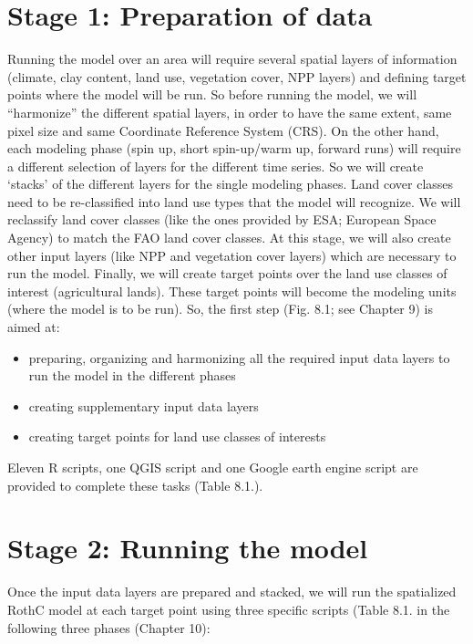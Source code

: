 \documentclass[
  10pt,
  b5paper,
]{book}
\providecommand{\tightlist}{%
  \setlength{\itemsep}{0pt}\setlength{\parskip}{0pt}}
\begin{document}
\hypertarget{stage-1-preparation-of-data}{%
\section{Stage 1: Preparation of data}\label{stage-1-preparation-of-data}}

Running the model over an area will require several spatial layers of information (climate, clay content, land use, vegetation cover, NPP layers) and defining target points where the model will be run. So before running the model, we will ``harmonize'' the different spatial layers, in order to have the same extent, same pixel size and same Coordinate Reference System (CRS). On the other hand, each modeling phase (spin up, short spin-up/warm up, forward runs) will require a different selection of layers for the different time series. So we will create `stacks' of the different layers for the single modeling phases.
Land cover classes need to be re-classified into land use types that the model will recognize. We will reclassify land cover classes (like the ones provided by ESA; European Space Agency) to match the FAO land cover classes.
At this stage, we will also create other input layers (like NPP and vegetation cover layers) which are necessary to run the model.
Finally, we will create target points over the land use classes of interest (agricultural lands). These target points will become the modeling units (where the model is to be run). So, the first step (Fig. 8.1; see Chapter 9) is aimed at:

\begin{itemize}
\tightlist
\item
  preparing, organizing and harmonizing all the required input data layers to run the model in the different phases
\item
  creating supplementary input data layers
\item
  creating target points for land use classes of interests
\end{itemize}

Eleven R scripts, one QGIS script and one Google earth engine script are provided to complete these tasks (Table 8.1.).

\hypertarget{stage-2-running-the-model}{%
\section{Stage 2: Running the model}\label{stage-2-running-the-model}}

Once the input data layers are prepared and stacked, we will run the spatialized RothC model at each target point using three specific scripts (Table 8.1. in the following three phases (Chapter 10):
\end{document}
